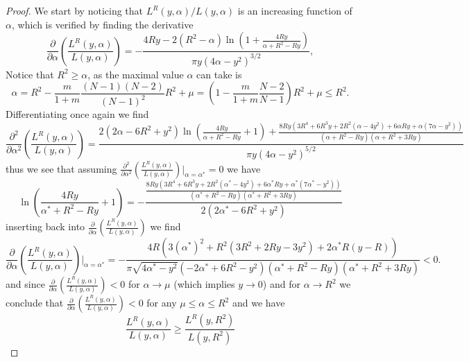 \documentclass[a4paper,11pt]{article}
\numberwithin{equation}{section}
\begin{document}
	\begin{proof}
		We start by noticing that $ L^R(y,\alpha)/L(y,\alpha) $ is an increasing function of $ \alpha $, which is verified by finding the derivative\begin{equation}
		\frac{\partial}{\partial \alpha}\left(\frac{L^R(y,\alpha)}{L(y,\alpha)}\right)=-\frac{4 R y-2 \left(R^2-\alpha \right) \ln \left(1+\frac{4 R y}{\alpha +R^2-R y}\right)}{\pi  y \left(4 \alpha -y^2\right)^{3/2}},
		\end{equation}
		Notice that $ R^2\geq\alpha $, as the maximal value $ \alpha $ can take is \begin{equation}
		\alpha=R^2-\frac{m}{1+m}\frac{(N-1)(N-2)}{(N-1)^2}R^2+\mu=\left(1-\frac{m}{1+m}\frac{N-2}{N-1}\right)R^2+\mu\leq R^2.
		\end{equation}
		Differentiating once again we find \begin{equation}
		\frac{\partial^2}{\partial \alpha^2}\left(\frac{L^R(y,\alpha)}{L(y,\alpha)}\right)=\frac{2 \left(2 \alpha -6 R^2+y^2\right) \ln \left(\frac{4 R y}{\alpha +R^2-R y}+1\right)+\frac{8 R y \left(3 R^4+6 R^3 y+2 R^2 \left(\alpha -4 y^2\right)+6 \alpha  R y+\alpha  \left(7 \alpha
				-y^2\right)\right)}{\left(\alpha +R^2-R y\right) \left(\alpha +R^2+3 R y\right)}}{\pi  y \left(4 \alpha -y^2\right)^{5/2}}
		\end{equation}
		thus we see that assuming $ \frac{\partial^2}{\partial \alpha^2}\left(\frac{L^R(y,\alpha)}{L(y,\alpha)}\right)\rvert_{\alpha=\alpha^*}=0 $ we have \begin{equation}
		\ln \left(\frac{4 R y}{\alpha^* +R^2-R y}+1\right)=-\frac{\frac{8 R y \left(3 R^4+6 R^3 y+2 R^2 \left(\alpha^* -4 y^2\right)+6 \alpha^*  R y+\alpha^*  \left(7 \alpha^*
				-y^2\right)\right)}{\left(\alpha^* +R^2-R y\right) \left(\alpha^* +R^2+3 R y\right)}}{2 \left(2 \alpha^* -6 R^2+y^2\right) }
		\end{equation}
		inserting back into $ \frac{\partial}{\partial \alpha}\left(\frac{L^R(y,\alpha)}{L(y,\alpha)}\right) $ we find \begin{equation}
		 \frac{\partial}{\partial \alpha}\left(\frac{L^R(y,\alpha)}{L(y,\alpha)}\right)\rvert_{\alpha=\alpha^*}=-\frac{4 R \left(3 (\alpha^*)^2+R^2 \left(3 R^2+2 R y-3 y^2\right)+2 \alpha^*  R (y-R)\right)}{\pi  \sqrt{4 \alpha^* -y^2} \left(-2 \alpha^* +6 R^2-y^2\right) \left(\alpha^* +R^2-R y\right) \left(\alpha^* +R^2+3 R y\right)}<0.
		\end{equation}
		and since $ \frac{\partial}{\partial \alpha}\left(\frac{L^R(y,\alpha)}{L(y,\alpha)}\right)<0 $ for $ \alpha\to \mu $ (which implies $ y\to 0 $) and for $ \alpha\to R^2 $ we conclude that $ \frac{\partial}{\partial \alpha}\left(\frac{L^R(y,\alpha)}{L(y,\alpha)}\right)<0 $ for any $ \mu\leq\alpha\leq R^2 $ and we have \begin{equation}
		\frac{L^R(y,\alpha)}{L(y,\alpha)}\geq\frac{L^R(y,R^2)}{L(y,R^2)}
		\end{equation}
	\end{proof}
	
\end{document}
